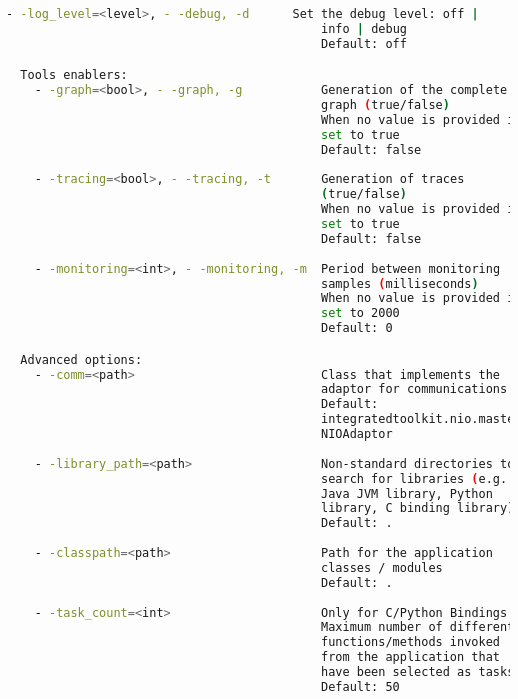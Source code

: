 \begin{lstlisting}[language=bash]
    - -log_level=<level>, - -debug, -d      Set the debug level: off | 
                                            info | debug
                                            Default: off

  Tools enablers:
    - -graph=<bool>, - -graph, -g           Generation of the complete
                                            graph (true/false)
                                            When no value is provided it is 
                                            set to true
                                            Default: false
                                            
    - -tracing=<bool>, - -tracing, -t       Generation of traces 
                                            (true/false)
                                            When no value is provided it is 
                                            set to true
                                            Default: false
                                            
    - -monitoring=<int>, - -monitoring, -m  Period between monitoring 
                                            samples (milliseconds)
                                            When no value is provided it is
                                            set to 2000
                                            Default: 0

  Advanced options:
    - -comm=<path>                          Class that implements the 
                                            adaptor for communications
                                            Default: 
                                            integratedtoolkit.nio.master.
                                            NIOAdaptor
                                            
    - -library_path=<path>                  Non-standard directories to 
                                            search for libraries (e.g. 
                                            Java JVM library, Python 
                                            library, C binding library) 
                                            Default: .
                                            
    - -classpath=<path>                     Path for the application  
                                            classes / modules
                                            Default: .
                                            
    - -task_count=<int>                     Only for C/Python Bindings. 
                                            Maximum number of different 
                                            functions/methods invoked 
                                            from the application that 
                                            have been selected as tasks
                                            Default: 50
                                            

\end{lstlisting}
